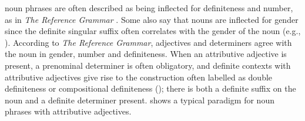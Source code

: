 \documentclass[output=paper,colorlinks,citecolor=brown,modfonts,nonflat]{../langscibook}
\begin{document}
 noun phrases are often described as being inflected for definiteness and number, as in \textit{The  Reference Grammar} \citep{FaarlundEtAl1997}. Some also say that nouns are inflected for gender since the definite singular suffix often correlates with the gender of the noun (e.g., \citealt{JohannessenLarsson2015}). According to \textit{The  Reference Grammar}, adjectives and determiners agree with the noun in gender, number and definiteness. When an attributive adjective is present, a prenominal determiner is often obligatory, and definite contexts with attributive adjectives give rise to the construction often labelled as double definiteness or compositional definiteness (\citealt{Julien2005,Baal2018}); there is both a definite suffix on the noun and a definite determiner present.  shows a typical paradigm for  noun phrases with attributive adjectives.
\end{document}
